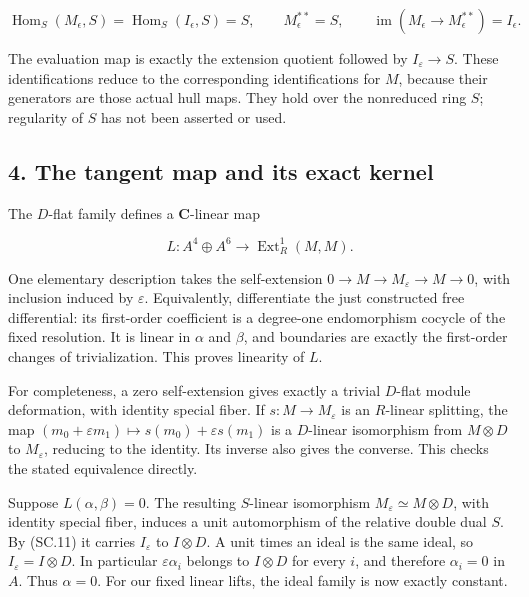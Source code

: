 \[
 \operatorname{Hom}_S(M_\epsilon,S)
    =\operatorname{Hom}_S(I_\epsilon,S)=S,
 \qquad M_\epsilon^{**}=S,
 \qquad
 \operatorname{im}(M_\epsilon\longrightarrow M_\epsilon^{**})
        =I_\epsilon.
 \tag{SC.11}
\]

The evaluation map is exactly the extension quotient followed by
\(I_\varepsilon\to S\). These identifications reduce to the corresponding
identifications for \(M\), because their generators are those actual
hull maps. They hold over the nonreduced ring \(S\); regularity of \(S\)
has not been asserted or used.

\subsection{4. The tangent map and its exact kernel}\label{SF-E847:s4}

The \(D\)-flat family defines a \(\mathbf C\)-linear map

\[
 L:A^4\oplus A^6\longrightarrow\operatorname{Ext}^1_R(M,M).
 \tag{SC.12}
\]

One elementary description takes the self-extension
\(0\to M\to M_\varepsilon\to M\to0\), with inclusion induced by \(\varepsilon\). Equivalently,
differentiate the just constructed free differential: its first-order
coefficient is a degree-one endomorphism cocycle of the fixed resolution.
It is linear in \(\alpha\) and \(\beta\), and boundaries are exactly the
first-order changes of trivialization. This proves linearity of \(L\).

For completeness, a zero self-extension gives exactly a trivial \(D\)-flat
module deformation, with identity special fiber. If \(s:M\to M_\varepsilon\) is
an \(R\)-linear splitting, the map
\((m_0+\varepsilon m_1)\mapsto s(m_0)+\varepsilon s(m_1)\) is a \(D\)-linear isomorphism
from \(M\otimes D\) to \(M_\varepsilon\), reducing to the identity. Its inverse
also gives the converse. This checks the stated equivalence directly.

Suppose \(L(\alpha,\beta)=0\). The resulting \(S\)-linear isomorphism
\(M_\varepsilon\simeq M\otimes D\), with identity special fiber, induces a unit
automorphism of the relative double dual \(S\). By (SC.11) it carries
\(I_\varepsilon\) to \(I\otimes D\). A unit times an ideal is the same ideal,
so \(I_\varepsilon=I\otimes D\). In particular \(\varepsilon\alpha_i\) belongs to
\(I\otimes D\) for every \(i\), and therefore \(\alpha_i=0\) in \(A\). Thus \(\alpha=0\).
For our fixed linear lifts, the ideal family is now exactly constant.


